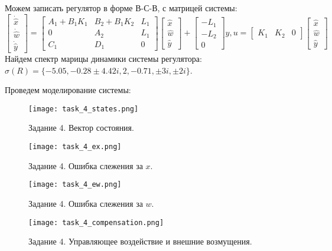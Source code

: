 Можем записать регулятор в форме В-С-В, с матрицей системы:
\begin{equation}
    \begin{bmatrix}
        \dot{\hat{x}} \\ \dot{\hat{w}} \\ \dot{\hat{y}}
    \end{bmatrix} =
    \begin{bmatrix}
        A_1 + B_1K_1 & B_2 + B_1K_2 & L_1 \\
        0 & A_2 & L_1 \\
        C_1 & D_1 & 0
    \end{bmatrix}
    \begin{bmatrix}
        {\hat{x}} \\ {\hat{w}} \\ {\hat{y}}
    \end{bmatrix} +
    \begin{bmatrix}
        -L_1 \\ -L_2 \\ 0
    \end{bmatrix}y, u = \begin{bmatrix}
        K_1 & K_2 & 0
    \end{bmatrix}\begin{bmatrix}
        {\hat{x}} \\ {\hat{w}} \\ {\hat{y}}
    \end{bmatrix}
\end{equation}
Найдем спектр марицы динамики системы регулятора: $\sigma(R)=\{-5.05, -0.28\pm 4.42i, 2, -0.71, \pm 3i, \pm 2i\}$.

Проведем моделирование системы:
\begin{figure}[h]
    \centering
    \texttt{[image: task\_4\_states.png]}
    \caption{\label{fig:task4_3_2}Задание 4. Вектор состояния.}
\end{figure}
\begin{figure}[]
    \centering
    \texttt{[image: task\_4\_ex.png]}
    \caption{\label{fig:task4_3_2}Задание 4. Ошибка слежения за $x$.}
\end{figure}
\begin{figure}[]
    \centering
    \texttt{[image: task\_4\_ew.png]}
    \caption{\label{fig:task4_3_2}Задание 4. Ошибка слежения за $w$.}
\end{figure}

\begin{figure}[]
    \centering
    \texttt{[image: task\_4\_compensation.png]}
    \caption{\label{fig:task4_3_2}Задание 4. Управляющее воздействие и внешние возмущения.}
\end{figure}

